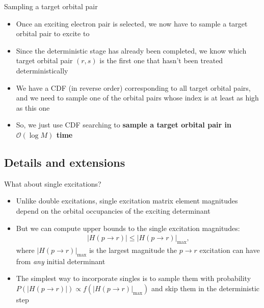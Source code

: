 \documentclass[amsmath]{beamer}
\begin{document}
\begin{frame}{Sampling a target orbital pair}
	\begin{itemize}
		\item Once an exciting electron pair is selected, we now have to sample a target orbital pair to excite to
		\item Since the deterministic stage has already been completed, we know which target orbital pair $(r,s)$ is the first one that hasn't been treated deterministically
		\item We have a CDF (in reverse order) corresponding to all target orbital pairs, and we need to sample one of the orbital pairs whose index is at least as high as this one
		\item So, we just use CDF searching to \textbf{sample a target orbital pair in $\mathcal{O}(\log M)$ time}
	\end{itemize}
\end{frame}

\subsection{Details and extensions}
\begin{frame}{What about single excitations?}
	\begin{itemize}
		\item Unlike double excitations, single excitation matrix element magnitudes depend on the orbital occupancies of the exciting determinant
		\item But we can compute upper bounds to the single excitation magnitudes:
		\begin{eqnarray}
			\left|H(p\rightarrow r)\right| %
			\le \left|H(p\rightarrow r)\right|_{\max},%
		\end{eqnarray}
		where $|H(p\rightarrow r)|_{\max}$ is the largest magnitude the $p\rightarrow r$ excitation can have from \textit{any} initial determinant
		\item The simplest way to incorporate singles is to sample them with probability $P(|H(p\rightarrow r)|) \propto f(|H(p\rightarrow r)|_{\max})$ and skip them in the deterministic step
	\end{itemize}
\end{frame}
\end{document}
